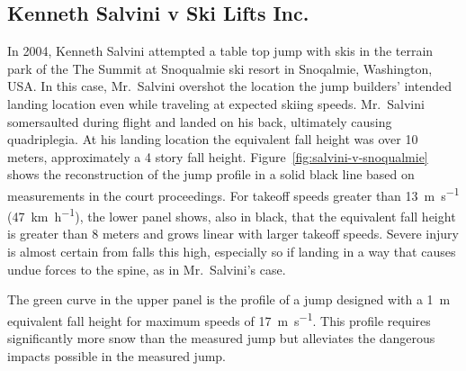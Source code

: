 \documentclass{article}
\begin{document}
\subsection{Kenneth Salvini v Ski Lifts Inc.}
%
In 2004, Kenneth Salvini attempted a table top jump with skis in the terrain
park of the The Summit at Snoqualmie ski resort in Snoqalmie, Washington, USA.
In this case, Mr.~Salvini overshot the location the jump builders' intended
landing location even while traveling at expected skiing speeds. Mr.~Salvini
somersaulted during flight and landed on his back, ultimately causing
quadriplegia. At his landing location the equivalent fall height was over 10
meters, approximately a 4 story fall height.
Figure~\ref{fig:salvini-v-snoqualmie} shows the reconstruction of the jump
profile in a solid black line based on measurements in the court proceedings.
For takeoff speeds greater than 13~\si{\meter\per\second}
(47~\si{\kilo\meter\per\hour}), the lower panel shows, also in black, that the
equivalent fall height is greater than 8 meters and grows linear with larger
takeoff speeds. Severe injury is almost certain from falls this high,
especially so if landing in a way that causes undue forces to the spine, as in
Mr.~Salvini's case.

The green curve in the upper panel is the profile of a jump designed with a
1~\si{\meter} equivalent fall height for maximum speeds of
17~\si{\meter\per\second}. This profile requires significantly more snow than
the measured jump but alleviates the dangerous impacts possible in the measured
jump.
\end{document}
